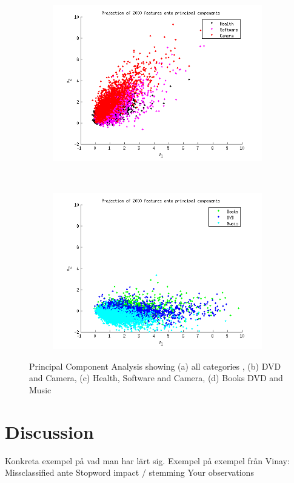 \begin{figure}[h!btcp]
	    \begin{subfigure}[b]{0.5\textwidth}
	            \centering
	            \includegraphics[width=\linewidth]{../Plottar/pca_largecorr.png}
	                           \caption{}
	    \end{subfigure}%
	    ~ %
	    \begin{subfigure}[b]{0.5\textwidth}
	            \centering
	            \includegraphics[width=\textwidth]{../Plottar/pca_somecorr.png} 
              \caption{}
	    \end{subfigure}
	    \caption{Principal Component Analysis showing (a) all categories , (b) DVD and Camera, (c) Health, Software and Camera, (d) Books DVD and Music}
	    \label{fig:pca_results}
\end{figure}


\section{Discussion}
Konkreta exempel på vad man har lärt sig.
Exempel på exempel från Vinay:
	Missclassified ante
	Stopword impact / stemming
	Your observations
